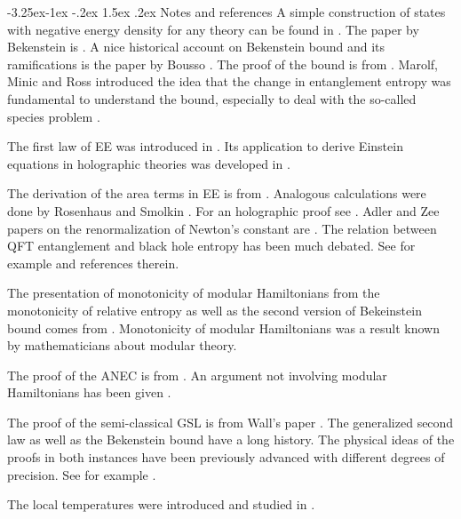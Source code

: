 \documentclass[11pt,a4paper]{article}
\makeatletter
\renewcommand\subsection{\@startsection{subsection}{2}{\z@}%
                                   {-3.25ex\@plus -1ex \@minus -.2ex}%
                                     {1.5ex \@plus .2ex}%
                                     {\normalfont\bfseries}}
\numberwithin{equation}{section}
\makeatother
\begin{document}
\subsection{Notes and references}
A simple construction of states with negative energy density for any theory can be found in \cite{Witten:2018lha}.  The paper by Bekenstein is \cite{bekenstein1981universal}. A nice historical account on Bekenstein bound and its ramifications is the paper by Bousso \cite{Bousso:2018bli}.
 The proof of the bound is from \cite{Casini:2008cr}. Marolf, Minic and Ross introduced the idea that the change in entanglement entropy was fundamental to understand the bound, especially to deal with the so-called species problem \cite{Marolf:2003sq}. 
 
The first law of EE was introduced in \cite{Blanco:2013joa,Wong:2013gua}. Its application to derive Einstein equations in holographic theories was developed in \cite{Lashkari:2013koa,Faulkner:2013ica}.   

The derivation of the area terms in EE is from \cite{Casini:2014yca}. Analogous calculations were done by Rosenhaus and Smolkin  \cite{Rosenhaus:2014ula}. For an holographic proof see \cite{Casini:2015ffa}. Adler and Zee papers on the renormalization of Newton's constant are \cite{Adler:1982ri,Zee:1980sj}. The relation between QFT entanglement and black hole entropy has been much debated. See for example \cite{Cooperman:2013iqr} and references therein. 

The presentation of monotonicity of modular Hamiltonians from the monotonicity of relative entropy as well as the second version of Bekeinstein bound comes from \cite{Blanco:2013lea}. Monotonicity of modular Hamiltonians was a result known by mathematicians about modular theory.     

The proof of the ANEC is from \cite{Faulkner:2016mzt}. An argument not involving modular Hamiltonians has been given \cite{Hartman:2016lgu}.  
 
The proof of the semi-classical GSL is from Wall's paper \cite{Wall:2011hj}. The generalized second law as well as the Bekenstein bound have a long history. The physical ideas of the proofs in both instances have been previously advanced with different degrees of precision. See for example \cite{Marolf:2003wu,Marolf:2003sq,sorkin1986toward,Sorkin:1997ja,Frolov:1993fy,zurek1985statistical}.

The local temperatures were introduced and studied in \cite{Arias:2016nip,Arias:2017dda}. 
\end{document}
